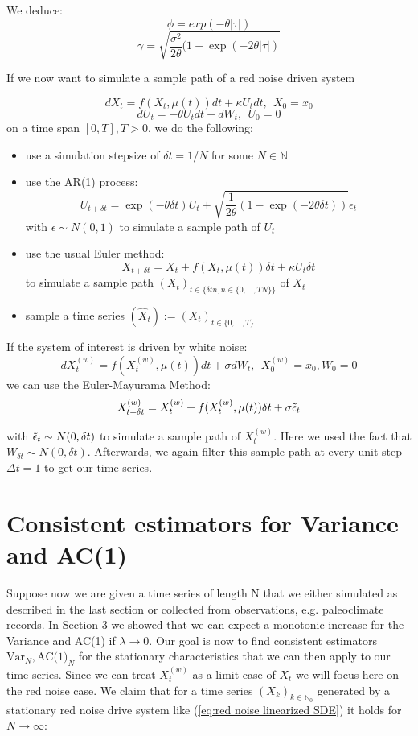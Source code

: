 \documentclass[%
thesis=student,%
coverpage=false,%
titlepage=false,%
headmarks=true, %
english,%
font=libertine, %
math=newpxtx, %
BCOR=5mm,%
coverBCOR=11mm%
]{tumbook}
\begin{document}
We deduce: 
    \[
        \phi = exp(-\theta \lvert \tau \rvert)
    \]
    \[
        \gamma = \sqrt{\frac{\sigma^{2}}{2\theta}(1-\exp(-2\theta \lvert \tau \rvert)}
    \]

If we now want to simulate a sample path of a red noise driven system

\[ 
     dX_{t} = f(X_{t},\mu(t))dt + \kappa U_{t}dt,\ \  X_{0} = x_{0}
\]
\[
     dU_{t} = -\theta U_{t}dt + dW_{t},\ \ U_{0} = 0
\]
on a time span $[0,T], T > 0$, we do the following: 
\begin{itemize}
    \item use a simulation stepsize of $\delta t = 1/N$ for some $N \in \mathbb{N}$
    \item use the AR(1) process:
    \[
    U_{t+\delta t} = \exp(-\theta \delta t)U_{t} + \sqrt{\frac{1}{2\theta}(1-\exp(-2\theta \delta t))}\epsilon_{t}
    \]
    with $\epsilon \sim N(0,1)$ to simulate a sample path of $U_{t}$
    \item use the usual Euler method:
    \[
        X_{t+\delta t} = X_{t} + f(X_{t},\mu(t))\delta t + \kappa U_{t}\delta t
    \]
    to simulate a sample path $(X_{t})_{t\in\{\delta t n, n \in \{0,...,TN\}\}}$ of $X_{t}$
    \item sample a time series $(\widehat{X}_t) := (X_t)_{t\in\{0,...,T\}}$
\end{itemize}


If the system of interest is driven by white noise: 
\[
    dX_{t}^{(w)} = f(X_{t}^{(w)},\mu(t))dt + \sigma dW_{t}, \ \ X_{0}^{(w)} = x_{0}, W_{0} = 0
\]
we can use the Euler-Mayurama Method:
\[
X_{t+\delta t}^{(w)} = X_{t}^{(w)} + f(X_{t}^{(w)},\mu(t))\delta t + \sigma\Tilde{\epsilon}_t
\]

with $\Tilde{\epsilon}_t \sim N(0,\delta t)$ to simulate a sample path of $X_{t}^{(w)}$. Here we used the fact that $W_{\delta t} \sim N(0,\delta t)$. Afterwards, we again filter this sample-path at every unit step $\Delta t = 1$ to get our time series.



\chapter{Consistent estimators for Variance and AC(1)}

Suppose now we are given a time series of length N that we either simulated as described in the last section or collected from observations, e.g. paleoclimate records. In Section 3 we showed that we can expect a monotonic increase for the Variance and AC(1) if $\lambda \rightarrow 0$. Our goal is now to find consistent estimators $\text{Var}_N, \text{AC(1)}_N$ for the stationary characteristics that we can then apply to our time series. Since we can treat $X_{t}^{(w)}$ as a limit case of $X_{t}$ we will focus here on the red noise case. We claim that for a time series $(X_{k})_{k\in\mathbb{N}_{0}}$ generated by a stationary red noise drive system like (\ref{eq:red noise linearized SDE}) it holds for $N \rightarrow \infty$:
\end{document}

